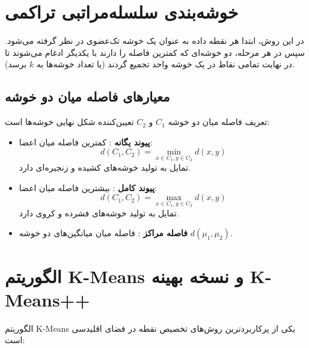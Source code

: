 \section{خوشه‌بندی سلسله‌مراتبی تراکمی \texorpdfstring{}{(Agglomerative)}}
در این روش، ابتدا هر نقطه داده به عنوان یک خوشه تک‌عضوی در نظر گرفته می‌شود. سپس در هر مرحله، دو خوشه‌ای که کمترین فاصله را دارند با یکدیگر ادغام می‌شوند تا در نهایت تمامی نقاط در یک خوشه واحد تجمیع گردند (یا تعداد خوشه‌ها به $k$ برسد).

\subsection{معیارهای فاصله میان دو خوشه}
تعریف فاصله میان دو خوشه $C_1$ و $C_2$ تعیین‌کننده شکل نهایی خوشه‌ها است:
\begin{itemize}
    \item \textbf{پیوند یگانه }: کمترین فاصله میان اعضا:
    \begin{equation}
    d(C_1, C_2) = \min_{x \in C_1, y \in C_2} d(x, y)
    \end{equation}
    تمایل به تولید خوشه‌های کشیده و زنجیره‌ای دارد.
    
    \item \textbf{پیوند کامل }: بیشترین فاصله میان اعضا:
    \begin{equation}
    d(C_1, C_2) = \max_{x \in C_1, y \in C_2} d(x, y)
    \end{equation}
    تمایل به تولید خوشه‌های فشرده و کروی دارد.
    
    \item \textbf{فاصله مراکز }: فاصله میان میانگین‌های دو خوشه $d(\mu_1, \mu_2)$.
\end{itemize}

\section{الگوریتم K-Means و نسخه بهینه K-Means++}
الگوریتم K-Means یکی از پرکاربردترین روش‌های تخصیص نقطه در فضای اقلیدسی است:

